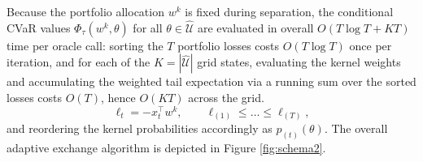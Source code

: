 \documentclass[smallcondensed]{svjour3}
\begin{document}
Because the portfolio allocation $w^k$ is fixed during separation, the conditional CVaR values $\Phi_\tau(w^k,\theta)$ for all $\theta\in\widehat{\mathcal{U}}$ are evaluated in overall $O(T\log T + KT)$ time per oracle call: sorting the $T$ portfolio losses costs $O(T\log T)$ once per iteration, and for each of the $K = |\widehat{\mathcal{U}}|$ grid states, evaluating the kernel weights and accumulating the weighted tail expectation via a running sum over the sorted losses costs $O(T)$, hence $O(KT)$ across the grid.
\begin{equation}
\ell_t = -x_t^\top w^k,\qquad \ell_{(1)} \le \dots \le \ell_{(T)},
\end{equation}
and reordering the kernel probabilities accordingly as $p_{(t)}(\theta)$.
The overall adaptive exchange algorithm is depicted in Figure \ref{fig:schema2}.
\end{document}
